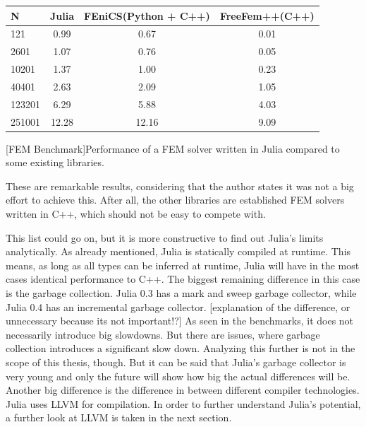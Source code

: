 \begin{table}[htbp]
    \centering
    \begin{tabular}{l|c|c|c}
        \hline
        \textbf{N}  & \textbf{Julia} & \textbf{FEniCS(Python + C++)}  & \textbf{FreeFem++(C++)}\\
        \hline
        121         & 0.99           & 0.67             & 0.01 \\
        2601        & 1.07           & 0.76             & 0.05 \\
        10201       & 1.37           & 1.00             & 0.23 \\
        40401       & 2.63           & 2.09             & 1.05 \\
        123201      & 6.29           & 5.88             & 4.03 \\
        251001      & 12.28          & 12.16            & 9.09 \\
        \hline
    \end{tabular}
    [FEM Benchmark]{Performance of a FEM solver written in Julia compared to some existing libraries. \cite{FMSolver}}
    \label{table:fembench}
\end{table}
These are remarkable results, considering that the author states it was not a big effort to achieve this. After all, the other libraries are established FEM solvers written in C++, which should not be easy to compete with.

This list could go on, but it is more constructive to find out Julia's limits analytically.
As already mentioned, Julia is statically compiled at runtime. This means, as long as all types can be inferred at runtime, Julia will have in the most cases identical performance to C++.
The biggest remaining difference in this case is the garbage collection. Julia 0.3 has a mark and sweep garbage collector, while Julia 0.4 has an incremental garbage collector.
[explanation of the difference, or unnecessary because its not important!?]
As seen in the benchmarks, it does not necessarily introduce big slowdowns.
But there are issues, where garbage collection introduces a significant slow down\cite{ReadDlmGC}.
Analyzing this further is not in the scope of this thesis, though. 
But it can be said that Julia's garbage collector is very young and only the future will show how big the actual differences will be.
Another big difference is the difference in between different compiler technologies.
Julia uses \ac{LLVM} for compilation.
In order to further understand Julia's potential, a further look at LLVM is taken in the next section.

